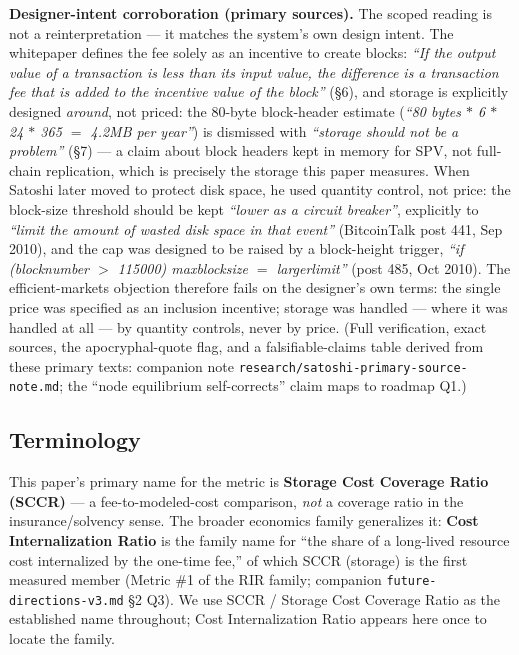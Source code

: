 \documentclass[11pt]{article}
\begin{document}
\textbf{Designer-intent corroboration (primary sources).} The scoped reading is not a reinterpretation --- it matches the system's own design intent. The whitepaper defines the fee solely as an incentive to create blocks: \emph{``If the output value of a transaction is less than its input value, the difference is a transaction fee that is added to the incentive value of the block''} (\S6), and storage is explicitly designed \emph{around}, not priced: the 80-byte block-header estimate (\emph{``80 bytes $*$ 6 $*$ 24 $*$ 365 $=$ 4.2MB per year''}) is dismissed with \emph{``storage should not be a problem''} (\S7) --- a claim about block headers kept in memory for SPV, not full-chain replication, which is precisely the storage this paper measures. When Satoshi later moved to protect disk space, he used quantity control, not price: the block-size threshold should be kept \emph{``lower as a circuit breaker''}, explicitly to \emph{``limit the amount of wasted disk space in that event''} (BitcoinTalk post 441, Sep 2010), and the cap was designed to be raised by a block-height trigger, \emph{``if (blocknumber $>$ 115000) maxblocksize $=$ largerlimit''} (post 485, Oct 2010). The efficient-markets objection therefore fails on the designer's own terms: the single price was specified as an inclusion incentive; storage was handled --- where it was handled at all --- by quantity controls, never by price. (Full verification, exact sources, the apocryphal-quote flag, and a falsifiable-claims table derived from these primary texts: companion note \texttt{research/satoshi-primary-source-note.md}; the ``node equilibrium self-corrects'' claim maps to roadmap Q1.)

\subsection{Terminology}\label{sec:8.4}
This paper's primary name for the metric is \textbf{Storage Cost Coverage Ratio (SCCR)} --- a fee-to-modeled-cost comparison, \emph{not} a coverage ratio in the insurance/solvency sense. The broader economics family generalizes it: \textbf{Cost Internalization Ratio} is the family name for ``the share of a long-lived resource cost internalized by the one-time fee,'' of which SCCR (storage) is the first measured member (Metric \#1 of the RIR family; companion \texttt{future-directions-v3.md} \S2 Q3). We use SCCR / Storage Cost Coverage Ratio as the established name throughout; Cost Internalization Ratio appears here once to locate the family.
\end{document}
